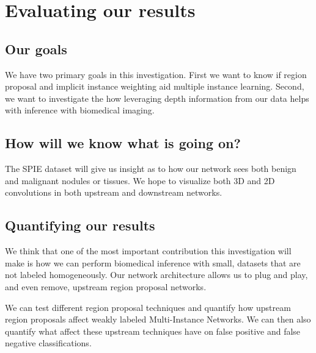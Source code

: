 \documentclass[twocolumn,10pt]{article}
\newcommand{\red}[1]{{\color{red}#1}}
\newcommand{\temp}[1]{{\red{#1}\\}}
\begin{document}
\section{Evaluating our results}

\subsection{Our goals}
We have two primary goals in this investigation. First we want to know if region
proposal and implicit instance weighting aid multiple instance learning. Second,
we want to investigate the how leveraging depth information from our data helps
with inference with biomedical imaging.

\subsection{How will we know what is going on?}

The SPIE dataset will give us insight as to how our network sees both benign
and malignant nodules or tissues. We hope to visualize both 3D and 2D convolutions
in both upstream and downstream networks.

\subsection{Quantifying our results}

We think that one of the most important contribution this investigation will make
is how we can perform biomedical inference with small, datasets that are not
labeled homogeneously.
Our network architecture allows us to plug and play, and even remove, upstream
region proposal networks. 

We can test different region proposal techniques and quantify how upstream
region proposals affect weakly labeled Multi-Instance Networks. We can then
also quantify what affect these upstream techniques have on false positive and
false negative classifications.
\end{document}
